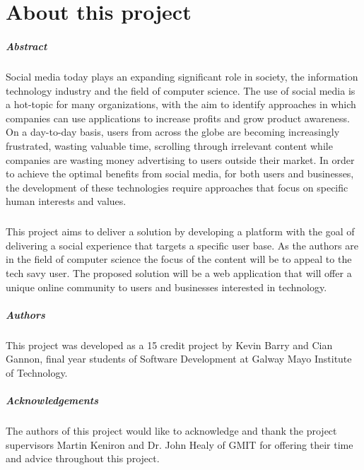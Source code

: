 
\chapter*{About this project}
\paragraph{Abstract}
Social media today plays an expanding significant role in society, the information technology industry and the field of computer science. The use of social media is a hot-topic for many organizations, with the aim to identify approaches in which companies can use applications to increase profits and grow product awareness. On a day-to-day basis, users from across the globe are becoming increasingly frustrated, wasting valuable time, scrolling through irrelevant content while companies are wasting money advertising to users outside their market.  In order to achieve the optimal benefits from social media, for both users and businesses, the development of these technologies require approaches that focus on specific human interests and values.

\paragraph{}
This project aims to deliver a solution by developing a platform with the goal of delivering a social experience that targets a specific user base. As the authors are in the field of computer science the focus of the content will be to appeal to the tech savy user. The proposed solution will be a web application that will offer a unique online community to users and businesses interested in technology. 

\paragraph{Authors}
This project was developed as a 15 credit project by Kevin Barry and Cian Gannon, final year students of Software Development at Galway Mayo Institute of Technology.

\paragraph{Acknowledgements}
The authors of this project would like to acknowledge and thank the project supervisors Martin Keniron and Dr. John Healy of GMIT for offering their time and advice throughout this project.















